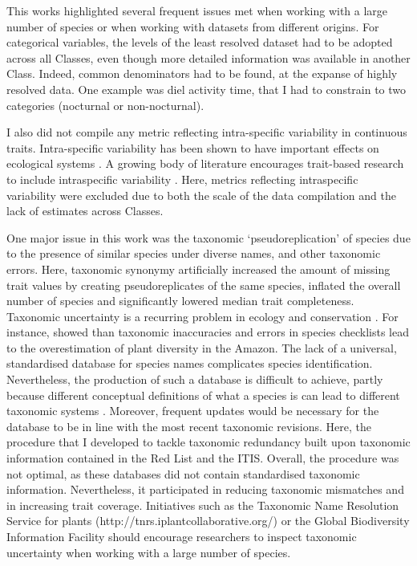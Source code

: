 This works highlighted several frequent issues met when working with a large number of species or when working with datasets from different origins. For categorical variables, the levels of the least resolved dataset had to be adopted across all Classes, even though more detailed information was available in another Class. Indeed, common denominators had to be found, at the expanse of highly resolved data. One example was diel activity time, that I had to constrain to two categories (nocturnal or non-nocturnal).

I also did not compile any metric reflecting intra-specific variability in continuous traits. Intra-specific variability has been shown to have important effects on ecological systems \citep{DesRoches2018, Bolnick2011, Gonzalez-Suarez2013a}. A growing body of literature encourages trait-based research to include intraspecific variability \citep{Carmona2016, Violle2012}. Here, metrics reflecting intraspecific variability were excluded due to both the scale of the data compilation and the lack of estimates across Classes.

One major issue in this work was the taxonomic `pseudoreplication' of species due to the presence of similar species under diverse names, and other taxonomic errors. Here, taxonomic synonymy artificially increased the amount of missing trait values by creating pseudoreplicates of the same species, inflated the overall number of species and significantly lowered median trait completeness. Taxonomic uncertainty is a recurring problem in ecology and conservation \citep{Isaac2004}. For instance, \citet{Cardoso2017} showed than taxonomic inaccuracies and errors in species checklists lead to the overestimation of plant diversity in the Amazon. The lack of a universal, standardised database for species names complicates species identification. Nevertheless, the production of such a database is difficult to achieve, partly because different conceptual definitions of what a species is can lead to different taxonomic systems \citep{Isaac2004}. Moreover, frequent updates would be necessary for the database to be in line with the most recent taxonomic revisions. Here, the procedure that I developed to tackle taxonomic redundancy built upon taxonomic information contained in the Red List and the ITIS. Overall, the procedure was not optimal, as these databases did not contain standardised taxonomic information. Nevertheless, it participated in reducing taxonomic mismatches and in increasing trait coverage. Initiatives such as the Taxonomic Name Resolution Service for plants (http://tnrs.iplantcollaborative.org/) or the Global Biodiversity Information Facility should encourage researchers to inspect taxonomic uncertainty when working with a large number of species.

